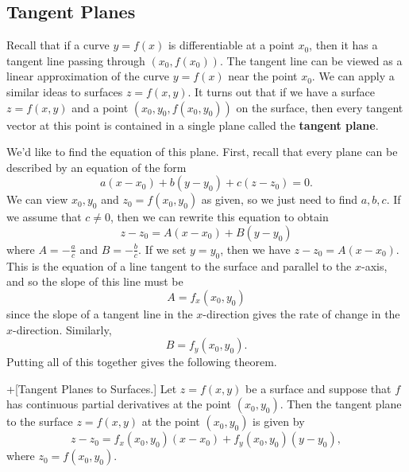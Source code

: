 \documentclass[10pt,]{book}
\newcommand{\terminology}[1]{\textbf{#1}}
\theoremstyle{ptxplainnotitle}
\theoremstyle{ptxplaintitle}
\theoremstyle{ptxplainnotitle}
\theoremstyle{ptxplaintitle}
\theoremstyle{ptxplainnotitle}
\theoremstyle{ptxplaintitle}
\theoremstyle{ptxdefinitionnotitle}
\theoremstyle{ptxdefinitiontitle}
\theoremstyle{ptxdefinitionnotitle}
\theoremstyle{ptxdefinitiontitle}
\theoremstyle{ptxdefinitionnotitle}
\theoremstyle{ptxdefinitiontitle}
\theoremstyle{ptxdefinitionnotitle}
\theoremstyle{ptxdefinitiontitle}
\theoremstyle{ptxdefinitionnotitle}
\theoremstyle{ptxdefinitiontitle}
\numberwithin{equation}{section}
\begin{document}
\subsection[{Tangent Planes}]{Tangent Planes}\label{subsection-tangent-planes}
\hypertarget{p-1027}{}%
Recall that if a curve \(y=f(x)\) is differentiable at a point \(x_{0}\), then it has a tangent line passing through \((x_{0},f(x_{0})).\) The tangent line can be viewed as a linear approximation of the curve \(y=f(x)\) near the point \(x_{0}\). We can apply a similar ideas to surfaces \(z = f(x,y)\). It turns out that if we have a surface \(z = f(x,y)\) and a point \((x_{0},y_{0}, f(x_{0},y_{0}))\) on the surface, then every tangent vector at this point is contained in a single plane called the \terminology{tangent plane}.%
\par
\hypertarget{p-1028}{}%
We'd like to find the equation of this plane. First, recall that every plane can be described by an equation of the form%
\begin{equation*}
a(x-x_{0})+b(y-y_{0})+c(z-z_{0}) = 0.
\end{equation*}
We can view \(x_{0},y_{0}\) and \(z_{0} = f(x_{0},y_{0})\) as given, so we just need to find \(a,b,c\). If we assume that \(c\neq 0\), then we can rewrite this equation to obtain%
\begin{equation*}
z-z_{0} = A(x-x_{0}) + B(y-y_{0})
\end{equation*}
where \(A = -\frac{a}{c}\) and \(B = -\frac{b}{c}\). If we set \(y=y_{0}\), then we have \(z-z_{0} = A(x-x_{0})\). This is the equation of a line tangent to the surface and parallel to the \(x\)-axis, and so the slope of this line must be%
\begin{equation*}
A = f_{x}(x_{0},y_{0})
\end{equation*}
since the slope of a tangent line in the \(x\)-direction gives the rate of change in the \(x\)-direction. Similarly,%
\begin{equation*}
B = f_{y}(x_{0},y_{0}).
\end{equation*}
Putting all of this together gives the following theorem.%
\begin{theorem}+[{Tangent Planes to Surfaces.}]\label{theorem-tangent-planes-to-surfaces}
\hypertarget{p-1029}{}%
Let \(z = f(x,y)\) be a surface and suppose that \(f\) has continuous partial derivatives at the point \((x_{0},y_{0})\). Then the tangent plane to the surface \(z = f(x,y)\) at the point \((x_{0},y_{0})\) is given by%
\begin{equation*}
z - z_{0} = f_{x}(x_{0},y_{0})(x - x_{0}) + f_{y}(x_{0},y_{0})(y - y_{0}),
\end{equation*}
where \(z_{0} = f(x_{0},y_{0})\).%
\end{theorem}
\end{document}
